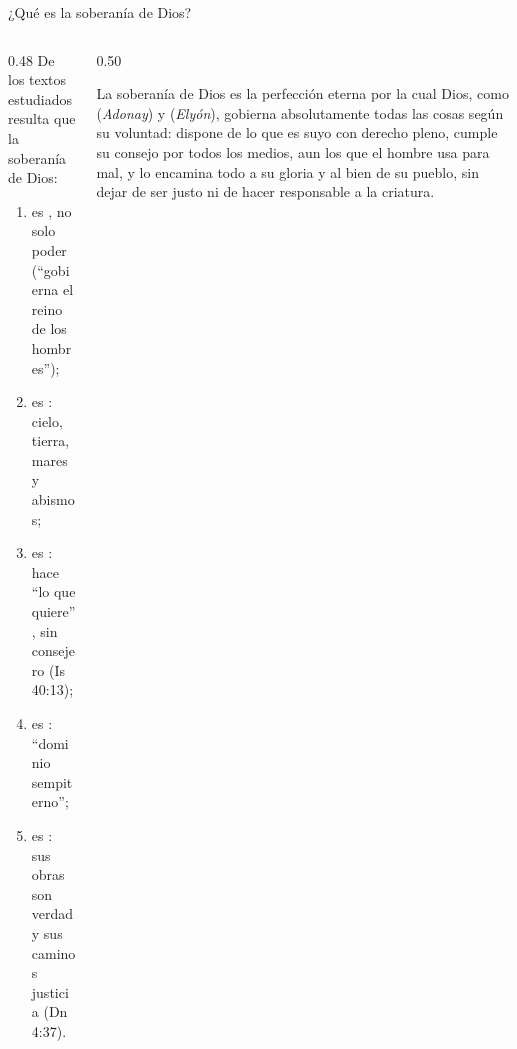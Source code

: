 \begin{frame}{¿Qué es la soberanía de Dios?}
\begin{columns}[c,onlytextwidth]
\begin{column}{0.48\textwidth}\small
De los textos estudiados resulta que la soberanía de Dios:
\begin{enumerate}
\item es , no solo poder (``gobierna el reino de los hombres'');
\item es : cielo, tierra, mares y abismos;
\item es : hace ``lo que quiere'', sin consejero (Is 40:13);
\item es : ``dominio sempiterno'';
\item es : sus obras son verdad y sus caminos justicia (Dn 4:37).
\end{enumerate}
\end{column}
\begin{column}{0.50\textwidth}
\begin{tcolorbox}[colback=papiro,colframe=azul,boxrule=1pt,arc=3pt,title={\small Definición},colbacktitle=azul,coltitle=papiro]
\small La soberanía de Dios es la perfección eterna por la cual Dios, como  (\emph{Adonay}) y  (\emph{Elyón}), gobierna absolutamente todas las cosas según su voluntad: dispone de lo que es suyo con derecho pleno, cumple su consejo por todos los medios, aun los que el hombre usa para mal, y lo encamina todo a su gloria y al bien de su pueblo, sin dejar de ser justo ni de hacer responsable a la criatura.
\end{tcolorbox}
\end{column}
\end{columns}
\end{frame}

